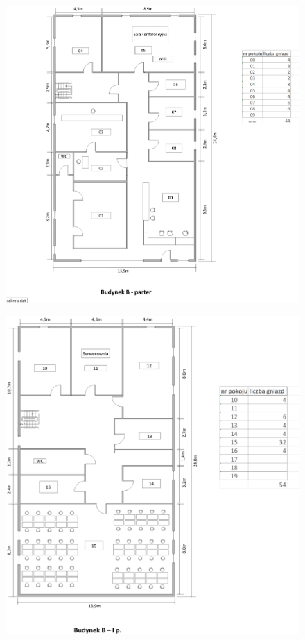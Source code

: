 \documentclass{report}
\begin{document}
\begin{figure}[H]
  \centering
      \includegraphics[width=\textwidth]{./obrazki/plany_wew/b0.png}
\end{figure}

\begin{figure}[H]
  \centering
      \includegraphics[width=\textwidth]{./obrazki/plany_wew/b1.png}
\end{figure}
\end{document}
